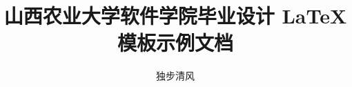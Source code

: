 \documentclass[fontset=adobe, openany, twoside]{sxaudocument}
\begin{document}
\pagestyle{empty}
\title{山西农业大学软件学院毕业设计 \LaTeX 模板示例文档}
\author{独步清风\quad{}}

% 

\tableofcontents
\thispagestyle{empty}

\pagestyle{main}




\end{document}
